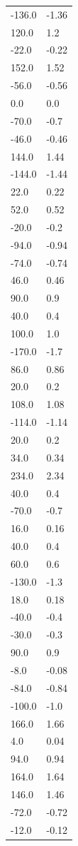 \begin{longtable}{ll}
-136.0 & -1.36 \\
120.0 & 1.2 \\
-22.0 & -0.22 \\
152.0 & 1.52 \\
-56.0 & -0.56 \\
0.0 & 0.0 \\
-70.0 & -0.7 \\
-46.0 & -0.46 \\
144.0 & 1.44 \\
-144.0 & -1.44 \\
22.0 & 0.22 \\
52.0 & 0.52 \\
-20.0 & -0.2 \\
-94.0 & -0.94 \\
-74.0 & -0.74 \\
46.0 & 0.46 \\
90.0 & 0.9 \\
40.0 & 0.4 \\
100.0 & 1.0 \\
-170.0 & -1.7 \\
86.0 & 0.86 \\
20.0 & 0.2 \\
108.0 & 1.08 \\
-114.0 & -1.14 \\
20.0 & 0.2 \\
34.0 & 0.34 \\
234.0 & 2.34 \\
40.0 & 0.4 \\
-70.0 & -0.7 \\
16.0 & 0.16 \\
40.0 & 0.4 \\
60.0 & 0.6 \\
-130.0 & -1.3 \\
18.0 & 0.18 \\
-40.0 & -0.4 \\
-30.0 & -0.3 \\
90.0 & 0.9 \\
-8.0 & -0.08 \\
-84.0 & -0.84 \\
-100.0 & -1.0 \\
166.0 & 1.66 \\
4.0 & 0.04 \\
94.0 & 0.94 \\
164.0 & 1.64 \\
146.0 & 1.46 \\
-72.0 & -0.72 \\
-12.0 & -0.12 \\

\end{longtable}
